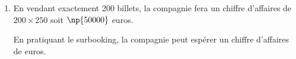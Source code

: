 \begin{enumerate}
\begin{enumerate}
On a E$(C) = \np{51500} \times \np{0,94775} + \ldots \np{46400} \times \np{0,00003} \approx \np{51429,2}$, soit ~\euro{} à l'euro près

		\item 
En vendant exactement 200 billets, la compagnie fera un chiffre d'affaires de $200\times 250$ soit $\np{50000}$ euros.

En pratiquant le surbooking, la compagnie peut espérer un chiffre d'affaires de  euros.
	\end{enumerate}
\end{enumerate}

\bigskip

